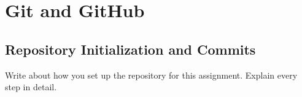 \documentclass[titlepage, 12pt]{article}
\title{\textbf{\HWClass \\ \HWTitle}}
\author{\HWAuthorName}
\date{\HWDate}
\begin{document}
	
	\maketitle
	
	\tableofcontents
	\pagebreak
	
	\section{Git and GitHub}
	\subsection{Repository Initialization and Commits}
	Write about how you set up the repository for this assignment. Explain every step in detail.
\end{document}
